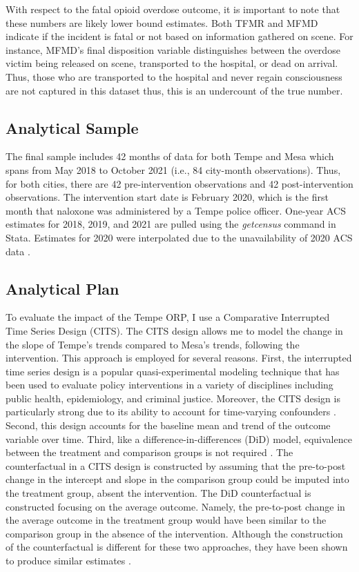 With respect to the fatal opioid overdose outcome, it is important to note that these numbers are likely lower bound estimates. Both TFMR and MFMD indicate if the incident is fatal or not based on information gathered on scene. For instance, MFMD's final disposition variable distinguishes between the overdose victim being released on scene, transported to the hospital, or dead on arrival. Thus, those who are transported to the hospital and never regain consciousness are not captured in this dataset thus, this is an undercount of the true number.

\subsection{Analytical Sample}
The final sample includes 42 months of data for both Tempe and Mesa which spans from May 2018 to October 2021 (i.e., 84 city-month observations). Thus, for both cities, there are 42 pre-intervention observations and 42 post-intervention observations. The intervention start date is February 2020, which is the first month that naloxone was administered by a Tempe police officer. One-year ACS estimates for 2018, 2019, and 2021 are pulled using the \textit{getcensus} command in Stata. Estimates for 2020 were interpolated due to the unavailability of 2020 ACS data \parencite{chamberlain_relative_2016}.

\subsection{Analytical Plan}

To evaluate the impact of the Tempe ORP, I use a Comparative Interrupted Time Series Design (CITS). The CITS design allows me to model the change in the slope of Tempe's trends compared to Mesa's trends, following the intervention. This approach is employed for several reasons. First, the interrupted time series design is a popular quasi-experimental modeling technique that has been used to evaluate policy interventions in a variety of disciplines including public health, epidemiology, and criminal justice. Moreover, the CITS design is particularly strong due to its ability to account for time-varying confounders \parencite{lopez_bernal_use_2018}. Second, this design accounts for the baseline mean and trend of the outcome variable over time. Third, like a difference-in-differences (DiD) model, equivalence between the treatment and comparison groups is not required \parencite{anglin_validity_2023}. The counterfactual in a CITS design is constructed by assuming that the pre-to-post change in the intercept and slope in the comparison group could be imputed into the treatment group, absent the intervention. The DiD counterfactual is constructed focusing on the average outcome. Namely, the pre-to-post change in the average outcome in the treatment group would have been similar to the comparison group in the absence of the intervention. Although the construction of the counterfactual is different for these two approaches, they have been shown to produce similar estimates \parencite{anglin_validity_2023, somers_validity_2013}. 

